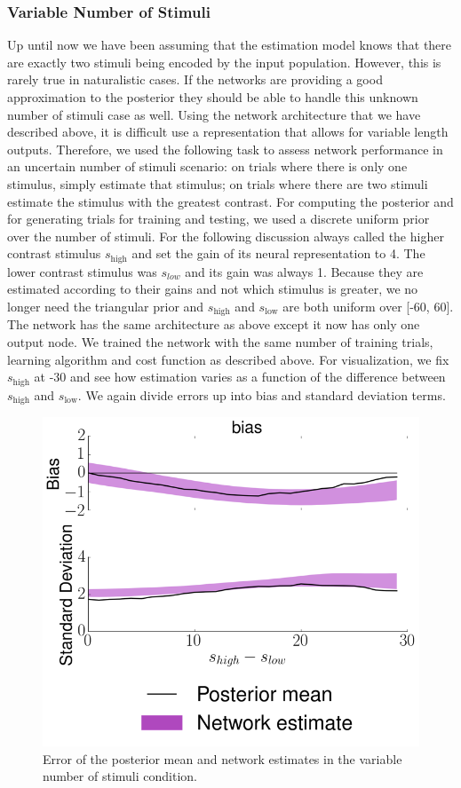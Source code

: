 \documentclass{article} %
\begin{document}
\subsubsection{Variable Number of Stimuli}
Up until now we have been assuming that the estimation model knows that there are exactly two stimuli being encoded by the input population. However, this is rarely true in naturalistic cases. If the networks are providing a good approximation to the posterior they should be able to handle this unknown number of stimuli case as well. Using the network architecture that we have described above, it is difficult use a representation that allows for variable length outputs. Therefore, we used the following task to assess network performance in an uncertain number of stimuli scenario: on trials where there is only one stimulus, simply estimate that stimulus; on trials where there are two stimuli estimate the stimulus with the greatest contrast. For computing the posterior and for generating trials for training and testing, we used a discrete uniform prior over the number of stimuli. For the following discussion always called the higher contrast stimulus $s_{\text{high}}$ and set the gain of its neural representation to 4. The lower contrast stimulus was $s_{low}$ and its gain was always 1. Because they are estimated according to their gains and not which stimulus is greater, we no longer need the triangular prior and $s_{\text{high}}$ and $s_{\text{low}}$ are both uniform over [-60, 60]. The network has the same architecture as above except it now has only one output node. We trained the network with the same number of training trials, learning algorithm and cost function as described above. For visualization, we fix $s_{\text{high}}$ at -30 and see how estimation varies as a function of the difference between $s_{\text{high}}$ and $s_{\text{low}}$. We again divide errors up into bias and standard deviation terms.
\begin{figure}[h]
\centering
\includegraphics[width = .7\textwidth]{Single_Estimation.png}
\caption{Error of the posterior mean and network estimates in the variable number of stimuli condition.}
\end{figure}
\end{document}
